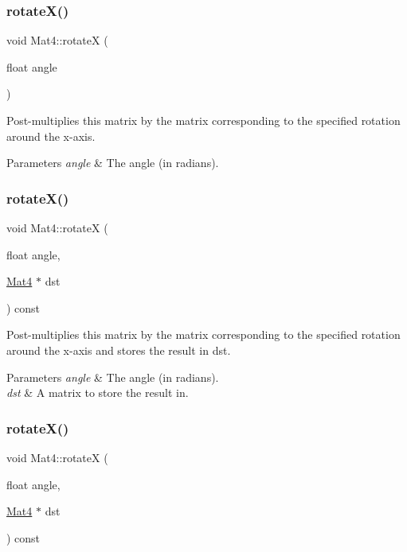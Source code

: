 \subsubsection{\texorpdfstring{rotate\+X()}{rotateX()}\hspace{0.1cm}{\footnotesize\ttfamily [2/4]}}
{\footnotesize\ttfamily void Mat4\+::rotateX (\begin{DoxyParamCaption}\item[{float}]{angle }\end{DoxyParamCaption})}

Post-\/multiplies this matrix by the matrix corresponding to the specified rotation around the x-\/axis.


\begin{DoxyParams}{Parameters}
{\em angle} & The angle (in radians). \\
\hline
\end{DoxyParams}
\mbox{\label{classMat4_a8fd010ff0b011e0e2b9f97e1b83df9e5}} 
\subsubsection{\texorpdfstring{rotate\+X()}{rotateX()}\hspace{0.1cm}{\footnotesize\ttfamily [3/4]}}
{\footnotesize\ttfamily void Mat4\+::rotateX (\begin{DoxyParamCaption}\item[{float}]{angle,  }\item[{\hyperlink{classMat4}{Mat4} $\ast$}]{dst }\end{DoxyParamCaption}) const}

Post-\/multiplies this matrix by the matrix corresponding to the specified rotation around the x-\/axis and stores the result in dst.


\begin{DoxyParams}{Parameters}
{\em angle} & The angle (in radians). \\
\hline
{\em dst} & A matrix to store the result in. \\
\hline
\end{DoxyParams}
\mbox{\label{classMat4_a8fd010ff0b011e0e2b9f97e1b83df9e5}} 
\subsubsection{\texorpdfstring{rotate\+X()}{rotateX()}\hspace{0.1cm}{\footnotesize\ttfamily [4/4]}}
{\footnotesize\ttfamily void Mat4\+::rotateX (\begin{DoxyParamCaption}\item[{float}]{angle,  }\item[{\hyperlink{classMat4}{Mat4} $\ast$}]{dst }\end{DoxyParamCaption}) const}

